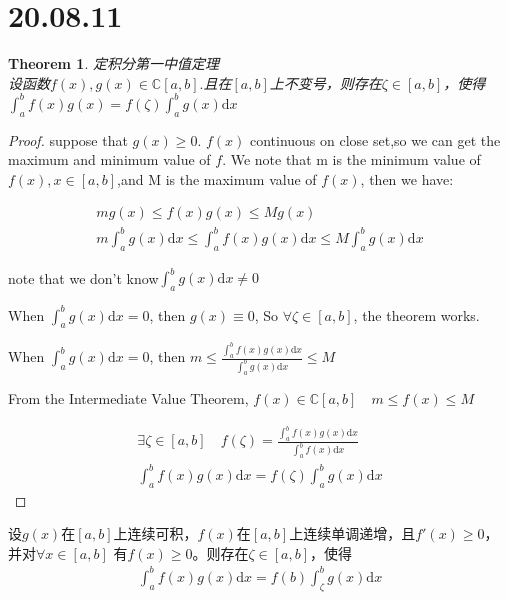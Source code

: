 \documentclass[10pt,a4paper]{book}
\newtheorem{theorem}{Theorem}[section]
\begin{document}
	\section{20.08.11}
\begin{theorem}	定积分第一中值定理\\
	设函数$ f(x),g(x) \in \mathbb{C}[a,b]. $且在$ [a,b] $上不变号，则存在$ \zeta \in  [a,b]$，使得$ \int_{a}^{b}f(x)g(x) = f(\zeta)\int_{a}^bg(x)\text{d}x $
	
\end{theorem}
\begin{proof}
	suppose that $ g(x)\ge 0 $. $ f(x) $ continuous on close set,so we can get the maximum and minimum value of $ f $. We note that m is the minimum value of $f(x), x\in [a,b] $,and M is the maximum value of $ f(x) $, then we have:

	\begin{gather}
		mg(x) \le f(x)g(x) \le Mg(x)\\
		m\int_{a}^{b}g(x)\text{d}x \le \int_{a}^{b}f(x)g(x)\text{d}x\le M\int_{a}^{b}g(x)\text{d}x
	\end{gather}

	note that we don't know$ \int_{a}^{b}g(x)\text{d}x \neq 0$
	
	When $ \int_{a}^{b}g(x)\text{d}x = 0$, then $ g(x) \equiv 0 $, So $ \forall \zeta \in [a,b] $, the theorem works.
	
	When $ \int_{a}^{b}g(x)\text{d}x = 0$, then $ m\le \frac{\int_{a}^{b}f(x)g(x)\text{d}x}{\int_{a}^{b}g(x)\text{d}x} \leq M $
	
	From the Intermediate Value Theorem, $ f(x) \in \mathbb{C}[a, b] \quad m\le f(x) \le M $
	
	\begin{gather}
		\exists \zeta \in [a,b] \quad f(\zeta) = \frac{\int_{a}^{b}f(x)g(x)\text{d}x}{\int_{a}^{b}f(x)\text{d}x}\\
		\int_{a}^{b}f(x)g(x)\text{d}x = f(\zeta)\int_{a}^{b}g(x)\text{d}x
	\end{gather}

\end{proof}

设$ g(x) $在$ [a,b] $上连续可积，$ f(x) $在$ [a,b] $上连续单调递增，且$ f'(x) \ge 0 $，并对$ \forall x\in [a,b] $ 有$ f(x)\ge 0 $。则存在$ \zeta \in [a,b] $，使得
\begin{gather}
	\int_{a}^{b}f(x)g(x)\text{d}x = f(b)\int_{\zeta}^{b}g(x)\text{d}x
\end{gather}
\end{document}
